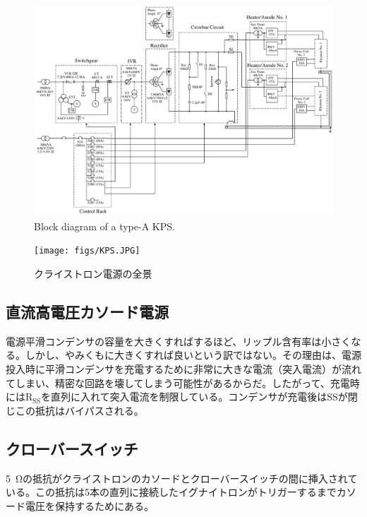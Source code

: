 \documentclass[10pt,a4paper,book,openany]{jlreq}
\theoremstyle{definition}
\begin{document}
\begin{figure}[!htt]
    \begin{center}
        \includegraphics[width=\linewidth]{figs/skeleton-diagram.pdf}
        \caption{Block diagram of a type-A KPS.}
        \label{f02-02}
    \end{center}
\end{figure}

\begin{figure}[!htt]
    \begin{center}
        \texttt{[image: figs/KPS.JPG]}
        \caption{クライストロン電源の全景}
        \label{kps_photo}
    \end{center}
\end{figure}

\subsection{直流高電圧カソード電源}
電源平滑コンデンサの容量を大きくすればするほど、リップル含有率は小さくなる。しかし、やみくもに大きくすれば良いという訳ではない。その理由は、電源投入時に平滑コンデンサを充電するために非常に大きな電流（突入電流）が流れてしまい、精密な回路を壊してしまう可能性があるからだ。したがって、充電時には$\mathrm{R_{SS}}$を直列に入れて突入電流を制限している。コンデンサが充電後はSSが閉じこの抵抗はバイパスされる。


\subsection{クローバースイッチ}
\SI{5}{\ohm}の抵抗がクライストロンのカソードとクローバースイッチの間に挿入されている。この抵抗は5本の直列に接続したイグナイトロンがトリガーするまでカソード電圧を保持するためにある。
\end{document}
